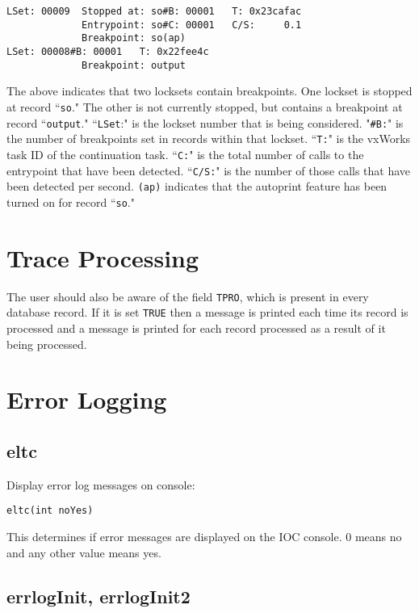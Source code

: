 \begin{verbatim}LSet: 00009  Stopped at: so#B: 00001   T: 0x23cafac
             Entrypoint: so#C: 00001   C/S:     0.1
             Breakpoint: so(ap)
LSet: 00008#B: 00001   T: 0x22fee4c
             Breakpoint: output
\end{verbatim}The above indicates that two locksets contain breakpoints. One lockset is stopped at record ``\verb|so|." The other is not 
currently stopped, but contains a breakpoint at record ``\verb|output|." ``\verb|LSet|:" is the lockset number that is being considered. 
"\verb|#B:|" is the number of breakpoints set in records within that lockset. ``\verb|T:|" is the vxWorks task ID of the continuation 
task. ``\verb|C:|" is the total number of calls to the entrypoint that have been detected. ``\verb|C/S:|" is the number of those calls that 
have been detected per second. \verb|(ap)| indicates that the autoprint feature has been turned on for record ``\verb|so|."

\section{Trace Processing}

The user should also be aware of the field \verb|TPRO|, which is present in every database record. If it is set \verb|TRUE| then a 
message is printed each time its record is processed and a message is printed for each record processed as a result of it 
being processed.

\section{Error Logging}

\subsection{eltc}

Display error log messages on console:

\begin{verbatim}eltc(int noYes)
\end{verbatim}This determines if error messages are displayed on the IOC console. 0 means no and any other value means yes.

\subsection{errlogInit, errlogInit2}

